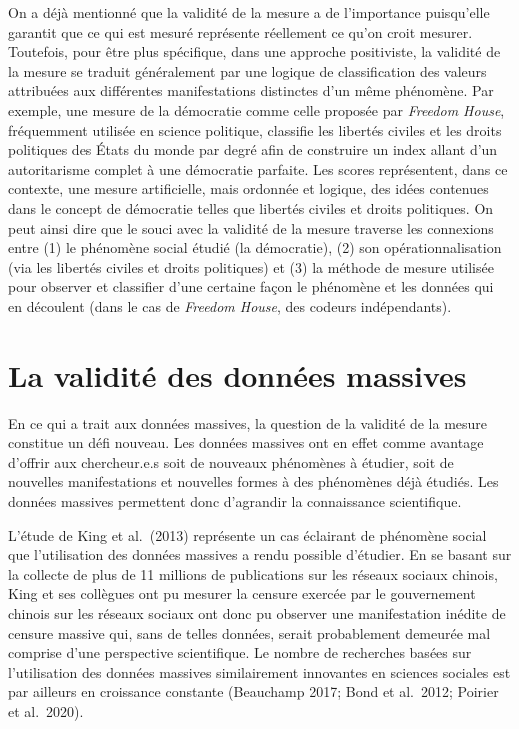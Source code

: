 \documentclass[
  letterpaper,
]{scrbook}
\begin{document}
On a déjà mentionné que la validité de la mesure a de l'importance
puisqu'elle garantit que ce qui est mesuré représente réellement ce
qu'on croit mesurer. Toutefois, pour être plus spécifique, dans une
approche positiviste, la validité de la mesure se traduit généralement
par une logique de classification des valeurs attribuées aux différentes
manifestations distinctes d'un même phénomène. Par exemple, une mesure
de la démocratie comme celle proposée par \emph{Freedom House},
fréquemment utilisée en science politique, classifie les libertés
civiles et les droits politiques des États du monde par degré afin de
construire un index allant d'un autoritarisme complet à une démocratie
parfaite. Les scores représentent, dans ce contexte, une mesure
artificielle, mais ordonnée et logique, des idées contenues dans le
concept de démocratie telles que libertés civiles et droits politiques.
On peut ainsi dire que le souci avec la validité de la mesure traverse
les connexions entre (1) le phénomène social étudié (la démocratie), (2)
son opérationnalisation (via les libertés civiles et droits politiques)
et (3) la méthode de mesure utilisée pour observer et classifier d'une
certaine façon le phénomène et les données qui en découlent (dans le cas
de \emph{Freedom House}, des codeurs indépendants).

\hypertarget{la-validituxe9-des-donnuxe9es-massives}{%
\section{La validité des données
massives}\label{la-validituxe9-des-donnuxe9es-massives}}

En ce qui a trait aux données massives, la question de la validité de la
mesure constitue un défi nouveau. Les données massives ont en effet
comme avantage d'offrir aux chercheur.e.s soit de nouveaux phénomènes à
étudier, soit de nouvelles manifestations et nouvelles formes à des
phénomènes déjà étudiés. Les données massives permettent donc d'agrandir
la connaissance scientifique.

L'étude de King et al.~(2013) représente un cas éclairant de phénomène
social que l'utilisation des données massives a rendu possible
d'étudier. En se basant sur la collecte de plus de 11 millions de
publications sur les réseaux sociaux chinois, King et ses collègues ont
pu mesurer la censure exercée par le gouvernement chinois sur les
réseaux sociaux ont donc pu observer une manifestation inédite de
censure massive qui, sans de telles données, serait probablement
demeurée mal comprise d'une perspective scientifique. Le nombre de
recherches basées sur l'utilisation des données massives similairement
innovantes en sciences sociales est par ailleurs en croissance constante
(Beauchamp 2017; Bond et al.~2012; Poirier et al.~2020).
\end{document}
